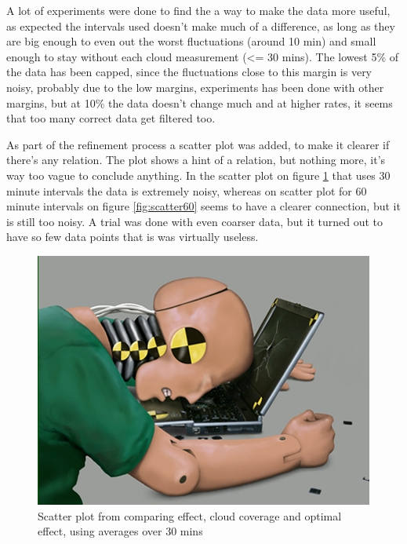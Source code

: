 A lot of experiments were done to find the a way to make the data more
useful, as expected the intervals used doesn't make much of a
difference, as long as they are big enough to even out the worst
fluctuations (around 10 min) and small enough to stay without each
cloud measurement (<= 30 mins).  The lowest 5\% of the data has been
capped, since the fluctuations close to this margin is very noisy,
probably due to the low margins, experiments has been done with other
margins, but at 10\% the data doesn't change much and at higher rates,
it seems that too many correct data get filtered too.

As part of the refinement process a scatter plot was added, to make it
clearer if there's any relation.  The plot shows a hint of a relation,
but nothing more, it's way too vague to conclude anything.  In the
scatter plot on figure \ref{fig:scatter30} that uses 30 minute
intervals the data is extremely noisy, whereas on scatter plot for 60
minute intervals on figure \ref{fig:scatter60} seems to have a clearer
connection, but it is still too noisy.  A trial was done with even
coarser data, but it turned out to have so few data points that is was
virtually useless.

\begin{figure}
  \centering
  \includegraphics{dummy.jpg}
  \caption{Scatter plot from comparing effect, cloud coverage and
    optimal effect, using averages over 30 mins}
  \label{fig:scatter30}
\end{figure}

